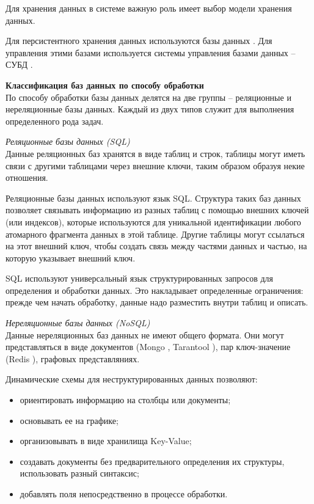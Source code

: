 Для хранения данных в системе важную роль имеет выбор модели хранения данных.  

Для персистентного хранения данных используются базы данных \cite{database}.
Для управления этими базами используется системы управления базами данных -- СУБД \cite{subd}.

\noindent\textbf{Классификация баз данных по способу обработки}\\

По способу обработки базы данных делятся на две группы -- реляционные и нереляционные базы данных. Каждый из двух типов служит для выполнения определенного рода задач.

\textit{Реляционные базы данных (SQL)}\\
Данные реляционных баз хранятся в виде таблиц и строк, таблицы могут иметь связи с другими таблицами через внешние ключи, таким образом образуя некие отношения.

Реляционные базы данных используют язык SQL. Структура таких баз данных позволяет связывать информацию из разных таблиц с помощью внешних ключей (или индексов), которые используются для уникальной идентификации любого атомарного фрагмента данных в этой таблице. Другие таблицы могут ссылаться на этот внешний ключ, чтобы создать связь между частями данных и частью, на которую указывает внешний ключ.

SQL используют универсальный язык структурированных запросов для определения и обработки данных. Это накладывает определенные ограничения: прежде чем начать обработку, данные надо разместить внутри таблиц и описать.

\textit{Нереляционные базы данных (NoSQL)}\\

Данные нереляционных баз данных не имеют общего формата. Они могут представляться в виде документов (Mongo \cite{mongodb}, Tarantool \cite{tarantool}), пар ключ-значение (Redis \cite{redis}), графовых представляниях.

Динамические схемы для неструктурированных данных позволяют:

\begin{itemize}
    \item ориентировать информацию на столбцы или документы;
    \item основывать ее на графике;
    \item организовывать в виде хранилища Key-Value;
    \item создавать документы без предварительного определения их структуры, использовать разный синтаксис;
    \item добавлять поля непосредственно в процессе обработки.
\end{itemize}

